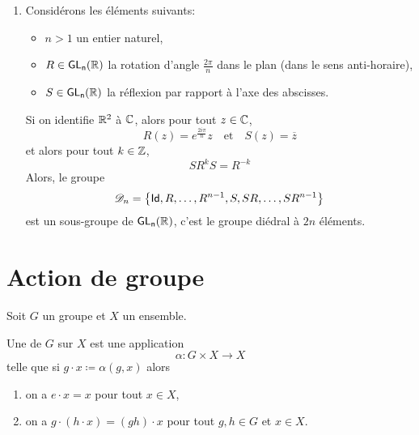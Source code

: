 \begin{enumerate}[label=(\roman*)]
    \item Considérons les éléments suivants:
    \begin{itemize}
        \item \(n > 1\) un entier naturel,
        \item \(R \in \operatorname{\mathsf{GL_{n}}}(\mathbb{R})\) la rotation d'angle \(\frac{2\pi}{n}\)
        dans le plan (dans le sens anti-horaire),
        \item \(S \in \operatorname{\mathsf{GL_{n}}}(\mathbb{R})\) la réflexion par rapport à l'axe des abscisses.
    \end{itemize}
    Si on identifie \(\mathbb{R}^2\) à \(\mathbb{C}\), alors pour tout \(z \in \mathbb{C}\),
    \begin{equation*}
        R(z) = e^{\frac{2i\pi}{n}}z \quad\text{et}\quad S(z) = \overline{z}
    \end{equation*}
    et alors pour tout \(k \in \mathbb{Z}\),
    \begin{equation*}
        S R^k S = R^{-k}
    \end{equation*}
    Alors, le groupe
    \begin{equation*}
        \mathscr{D}_n = \left\{ \operatorname{\mathsf{Id}}, R, \ldots, R^{n-1}, S, SR, \ldots, SR^{n-1} \right\}
    \end{equation*}
    est un sous-groupe de \(\operatorname{\mathsf{GL_{n}}}(\mathbb{R})\), c'est le groupe diédral à \(2n\) éléments.
\end{enumerate}

\section{Action de groupe}\label{sec:action-de-groupe}

Soit \(G\) un groupe et \(X\) un ensemble.

\begin{definition}
    Une  de \(G\) sur \(X\) est une application
    \begin{equation*}
        \alpha : G \times X \to X
    \end{equation*}
    telle que si \(g \cdot x \coloneq \alpha(g,x)\) alors
    \begin{enumerate}[label=(\roman*)]
        \item on a \(e \cdot x = x\) pour tout \(x \in X\),
        \item on a \(g \cdot (h \cdot x) = (gh) \cdot x\) pour tout \(g,h \in G\) et \(x \in X\).
    \end{enumerate}
\end{definition}

